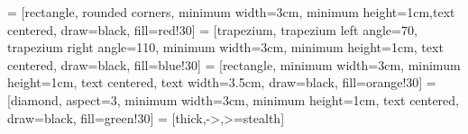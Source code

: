 \usetikzlibrary{angles, arrows, calc, decorations.pathmorphing, quotes, shapes.geometric, snakes, spy}

 = [rectangle, rounded corners, minimum width=3cm, minimum height=1cm,text centered, draw=black, fill=red!30]
 = [trapezium, trapezium left angle=70, trapezium right angle=110, minimum width=3cm, minimum height=1cm, text centered, draw=black, fill=blue!30]
 = [rectangle, minimum width=3cm, minimum height=1cm, text centered, text width=3.5cm, draw=black, fill=orange!30]
 = [diamond, aspect=3, minimum width=3cm, minimum height=1cm, text centered, draw=black, fill=green!30]
 = [thick,->,>=stealth]

\newcommand{\rotateRPY}[3]%
{   \pgfmathsetmacro{\rollangle}{#1}
    \pgfmathsetmacro{\pitchangle}{#2}
    \pgfmathsetmacro{\yawangle}{#3}
    
    \pgfmathsetmacro{\newxx}{cos(\yawangle)*cos(\pitchangle)}
    \pgfmathsetmacro{\newxy}{sin(\yawangle)*cos(\pitchangle)}
    \pgfmathsetmacro{\newxz}{-sin(\pitchangle)}
    \path (\newxx,\newxy,\newxz);
    \pgfgetlastxy{\nxx}{\nxy};
    
    \pgfmathsetmacro{\newyx}{cos(\yawangle)*sin(\pitchangle)*sin(\rollangle)-sin(\yawangle)*cos(\rollangle)}
    \pgfmathsetmacro{\newyy}{sin(\yawangle)*sin(\pitchangle)*sin(\rollangle)+ cos(\yawangle)*cos(\rollangle)}
    \pgfmathsetmacro{\newyz}{cos(\pitchangle)*sin(\rollangle)}
    \path (\newyx,\newyy,\newyz);
    \pgfgetlastxy{\nyx}{\nyy};
    
    \pgfmathsetmacro{\newzx}{cos(\yawangle)*sin(\pitchangle)*cos(\rollangle)+ sin(\yawangle)*sin(\rollangle)}
    \pgfmathsetmacro{\newzy}{sin(\yawangle)*sin(\pitchangle)*cos(\rollangle)-cos(\yawangle)*sin(\rollangle)}
    \pgfmathsetmacro{\newzz}{cos(\pitchangle)*cos(\rollangle)}
    \path (\newzx,\newzy,\newzz);
    \pgfgetlastxy{\nzx}{\nzy};
}
